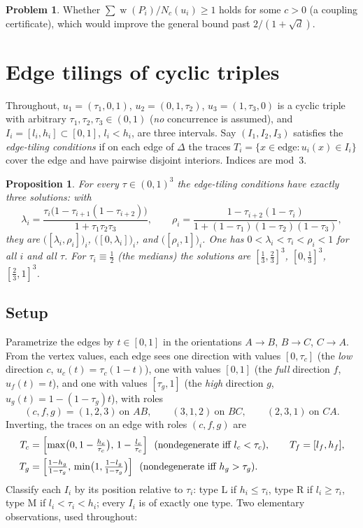\documentclass[11pt,reqno]{amsart}
\theoremstyle{plain}
\newtheorem{proposition}[theorem]{Proposition}
\theoremstyle{definition}
\newtheorem{problem}[theorem]{Problem}
\theoremstyle{remark}
\DeclareMathOperator{\wid}{w}
\begin{document}
\begin{problem}
Whether $\sum\wid(P_i)/N_c(u_i)\ge1$ holds for some $c>0$ (a coupling certificate),
which would improve the general bound past $2/(1+\sqrt d)$.
\end{problem}

\appendix
\section{Edge tilings of cyclic triples}\label{app:tilings}

Throughout, $u_1=(\tau_1,0,1)$, $u_2=(0,1,\tau_2)$, $u_3=(1,\tau_3,0)$ is a
cyclic triple with arbitrary $\tau_1,\tau_2,\tau_3\in(0,1)$ (\emph{no}
concurrence is assumed), and $I_i=[l_i,h_i]\subset[0,1]$, $l_i<h_i$, are three
intervals. Say $(I_1,I_2,I_3)$ satisfies the \emph{edge-tiling conditions} if on
each edge of $\Delta$ the traces $T_i=\{x\in\text{edge}: u_i(x)\in I_i\}$ cover
the edge and have pairwise disjoint interiors. Indices are mod~$3$.

\begin{proposition}\label{prop:tilings}
For every $\tau\in(0,1)^3$ the edge-tiling conditions have exactly three
solutions: with
\[
\lambda_i=\frac{\tau_i\bigl(1-\tau_{i+1}(1-\tau_{i+2})\bigr)}{1+\tau_1\tau_2\tau_3},
\qquad
\rho_i=\frac{1-\tau_{i+2}(1-\tau_i)}{1+(1-\tau_1)(1-\tau_2)(1-\tau_3)},
\]
they are $\bigl([\lambda_i,\rho_i]\bigr)_i$, $\bigl([0,\lambda_i]\bigr)_i$, and
$\bigl([\rho_i,1]\bigr)_i$. One has $0<\lambda_i<\tau_i<\rho_i<1$ for all $i$ and
all $\tau$. For $\tau_i\equiv\tfrac12$ (the medians) the solutions are
$[\tfrac13,\tfrac23]^3$, $[0,\tfrac13]^3$, $[\tfrac23,1]^3$.
\end{proposition}

\subsection*{Setup}
Parametrize the edges by $t\in[0,1]$ in the orientations $A\!\to\!B$,
$B\!\to\!C$, $C\!\to\!A$. From the vertex values, each edge sees one direction
with values $[0,\tau_c]$ (the \emph{low} direction $c$, $u_c(t)=\tau_c(1-t)$),
one with values $[0,1]$ (the \emph{full} direction $f$, $u_f(t)=t$), and one
with values $[\tau_g,1]$ (the \emph{high} direction $g$,
$u_g(t)=1-(1-\tau_g)t$), with roles
\[
(c,f,g)=(1,2,3)\ \text{on } AB,\qquad (3,1,2)\ \text{on } BC,\qquad
(2,3,1)\ \text{on } CA .
\]
Inverting, the traces on an edge with roles $(c,f,g)$ are
\begin{equation}\label{eq:traces}
\begin{aligned}
T_c&=\Bigl[\max\bigl(0,1-\tfrac{h_c}{\tau_c}\bigr),\,1-\tfrac{l_c}{\tau_c}\Bigr]
\ \ (\text{nondegenerate iff }l_c<\tau_c),\qquad T_f=[l_f,h_f],\\
T_g&=\Bigl[\tfrac{1-h_g}{1-\tau_g},\,
\min\bigl(1,\tfrac{1-l_g}{1-\tau_g}\bigr)\Bigr]
\ \ (\text{nondegenerate iff }h_g>\tau_g).
\end{aligned}
\end{equation}
Classify each $I_i$ by its position relative to $\tau_i$: type $\mathrm L$ if
$h_i\le\tau_i$, type $\mathrm R$ if $l_i\ge\tau_i$, type $\mathrm M$ if
$l_i<\tau_i<h_i$; every $I_i$ is of exactly one type. Two elementary
observations, used throughout:
\end{document}

